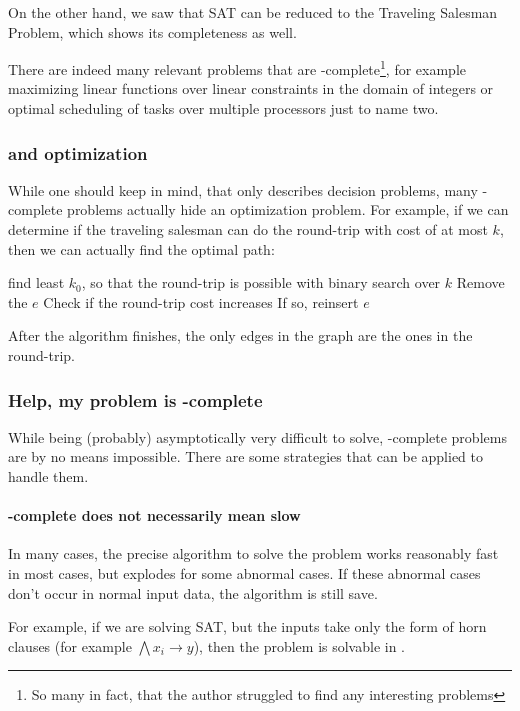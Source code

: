 On the other hand, we saw that SAT can be reduced to the Traveling Salesman 
Problem, which shows its completeness as well.

There are indeed many relevant problems that are \NPTIME-complete\footnote{So 
many in fact, that the author struggled to find any interesting \PTIME problems}, for 
example maximizing linear functions over linear constraints in the domain of 
integers or optimal scheduling of tasks over multiple processors just to name two.

\subsubsection{\NPTIME and optimization}
\label{np-opti}
While one should keep in mind, that \NPTIME only
describes decision problems, many \NPTIME-complete
problems actually hide an optimization problem. For
example, if we can determine if the traveling
salesman can do the round-trip with cost of at most
$k$, then we can actually find the optimal path:

\begin{algorithmic}[1]
	\State find least $k_0$, so that the round-trip is possible with binary search over $k$
		\State Remove the $e$
		\State Check if the round-trip cost increases
		\State If so, reinsert $e$
	\EndFor
\end{algorithmic}

After the algorithm finishes, the only edges in the graph are the ones in the round-trip.

\subsubsection{Help, my problem is \NPTIME-complete}
While being (probably) asymptotically very difficult to solve, 
\NPTIME-complete problems are by no means impossible. There are some 
strategies that can be applied to handle them.
\paragraph{\NPTIME-complete does not necessarily mean slow}
In many cases, the precise algorithm to solve the problem works reasonably 
fast in most cases, but explodes for some abnormal cases. If these abnormal 
cases don't occur in normal input data, the algorithm is still save.

For example, if we are solving SAT, but the inputs take only the form of horn 
clauses (for example $\bigwedge x_i \rightarrow y$), then the problem is 
solvable in \PTIME. 

